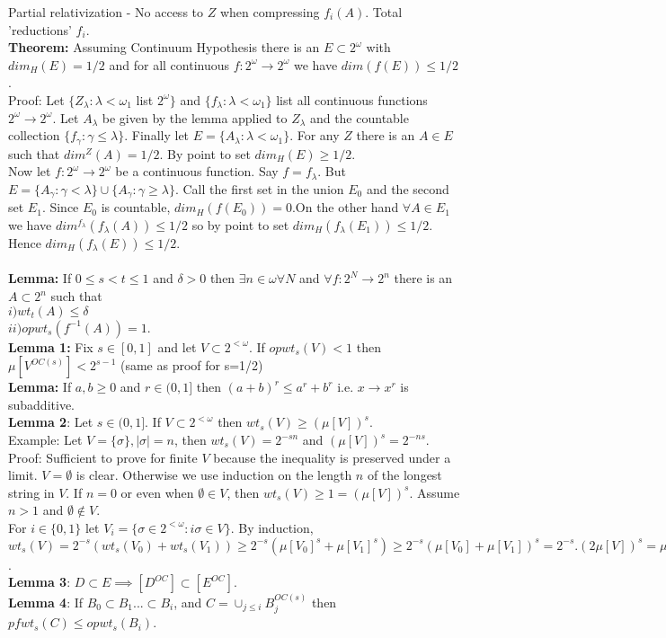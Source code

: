 \documentclass{article}
\begin{document}
   Partial relativization - No access to $Z$ when compressing $f_i(A)$. 
   Total 'reductions' $f_i$.\\
   \textbf{Theorem:} Assuming Continuum Hypothesis there is an $E \subset 2^\omega$ with $dim_H(E) = 1/2$ and for all continuous $f: 2^\omega \to 2^\omega$ we have $dim(f(E)) \leq 1/2$.\\
   Proof: Let $\{Z_\lambda: \lambda < \omega_1$ list $2^\omega\}$ and $\{f_\lambda: \lambda< \omega_1\}$ list all continuous functions $2^\omega \to 2^\omega$. Let $A_\lambda$ be given by the lemma applied to $Z_\lambda$ and the countable collection $\{f_\gamma : \gamma \leq \lambda\}$. Finally let $E = \{A_\lambda: \lambda < \omega_1\}$. For any $Z$ there is an $A \in E$ such that $dim^Z(A) = 1/2$. By point to set $dim_H(E) \geq 1/2$.\\
   Now let $f: 2^\omega \to 2^\omega$ be a continuous function. Say $f = f_\lambda$. But $E = \{A_\gamma: \gamma< \lambda\} \cup \{A_\gamma: \gamma \geq \lambda\}$. Call the first set in the union $E_0$ and the second set $E_1$. Since $E_0$ is countable, $dim_H(f(E_0))= 0 $.On the other hand $\forall A \in E_1$ we have $dim^{f_\lambda}(f_\lambda(A)) \leq 1/2$ so by point to set $dim_H(f_\lambda(E_1)) \leq 1/2$. Hence $dim_H(f_\lambda(E)) \leq 1/2$.\\\\
   \textbf{Lemma:} If $0 \leq s < t \leq 1$ and $\delta >0$ then $\exists n\in \omega \forall N$  and $\forall f: 2^N \to 2^n$ there is an $A \subset 2^n$ such that \\$i) wt_t(A) \leq \delta$\\
   $ii) opwt_s(f^{-1}(A)) =1$. \\
   \textbf{Lemma 1:} Fix $s \in [0,1]$ and let $V \subset 2^{<\omega}$. If $opwt_s(V) < 1$ then $\mu[V^{OC(s)}] < 2^{s-1}$ (same as proof for s=1/2)\\
   \textbf{Lemma:} If $a,b \geq 0$ and $r \in (0,1]$ then $(a+b)^r \leq a^r + b^r$ i.e. $x \to x^r$ is subadditive.\\
   \textbf{Lemma 2}: Let $s \in (0,1]$. If $V \subset 2^{<\omega}$ then $wt_s(V) \geq (\mu[V])^s$.\\
   Example: Let $V = \{\sigma\}, |\sigma| = n$, then $wt_s(V) = 2^{-sn}$ and $(\mu[V])^s = 2^{-ns} $.\\
   Proof: Sufficient to prove for finite $V$ because the inequality is preserved under a limit. $V = \emptyset$ is clear. Otherwise we use induction on the length $n$ of the longest string in $V$. If $n = 0$ or even when $\emptyset \in V$, then $wt_s(V) \geq 1 = (\mu[V])^s$. Assume $n>1$ and $\emptyset \not \in V$.\\
   For $i \in \{0,1\}$ let $V_i = \{\sigma \in 2^{<\omega}: i \sigma \in V\}$. By induction, $wt_s(V) =2^{-s} (wt_s(V_0)+ wt_s(V_1)) \geq 2^{-s}(\mu[V_0]^s + \mu[V_1]^s) \geq 2^{-s}(\mu[V_0]+ \mu[V_1])^s= 2^{-s}.(2\mu[V])^s = \mu[V]^s$.\\
   \textbf{Lemma 3}: $D \subset E \implies[ D^{OC}] \subset [E^{OC}]$.\\
   \textbf{Lemma 4}: If $B_0 \subset B_1 ... \subset B_i$, and $C = \cup_{j \leq i} B_j^{OC(s)}$ then $pfwt_s(C) \leq opwt_s(B_i)$.
   \newpage
\end{document}
